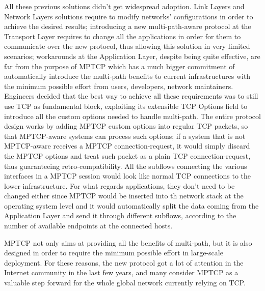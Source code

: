 \vspace{5mm}
All these previous solutions didn't get widespread adoption. Link Layers and Network Layers solutions require to modify networks' configurations in order to achieve the desired results; introducing a new multi-path-aware protocol at the Transport Layer requires to change all the applications in order for them to communicate over the new protocol, thus allowing this solution in very limited scenarios; workarounds at the Application Layer, despite being quite effective, are far from the purpose of MPTCP which has a much bigger commitment of automatically introduce the multi-path benefits to current infrastructures with the minimum possible effort from users, developers, network maintainers. Engineers decided that the best way to achieve all these requirements was to still use TCP as fundamental block, exploiting its extensible TCP Options field to introduce all the custom options needed to handle multi-path. The entire protocol design works by adding MPTCP custom options into regular TCP packets, so that MPTCP-aware systems can process such options; if a system that is not MPTCP-aware receives a MPTCP connection-request, it would simply discard the MPTCP options and treat such packet as a plain TCP connection-request, thus guaranteeing retro-compatibility. All the subflows connecting the various interfaces in a MPTCP session would look like normal TCP connections to the lower infrastructure. For what regards applications, they don't need to be changed either since MPTCP would be inserted into th network stack at the operating system level and it would automatically split the data coming from the Application Layer and send it through different subflows, according to the number of available endpoints at the connected hosts.


MPTCP not only aims at providing all the benefits of multi-path, but it is also designed in order to require the minimum possible effort in large-scale deployment. For these reasons, the new protocol got a lot of attention in the Internet community in the last few years, and many consider MPTCP as a valuable step forward for the whole global network currently relying on TCP.

